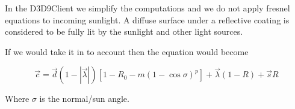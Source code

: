 \documentclass[twocolumn]{report}
\newenvironment{twocol}[0]{%
\begin{list}{}{%
\onecolumn
\setlength{\leftmargin}{0cm}%
\setlength{\rightmargin}{0cm}%
}%
\item[]}{\end{list}}
\begin{document}
\begin{twocol}
In the D3D9Client we simplify the computations and we do not apply fresnel equations to incoming sunlight. A diffuse surface under a reflective coating is considered to be fully lit by the sunlight and other light sources. 

If we would take it in to account then the equation would become

\begin{equation}
\vec{c} = \vec{d}(1-|\vec{\lambda}|)[1-R_0-m(1-\cos\sigma)^p] + \vec{\lambda}(1-R) + \vec{s}R
\end{equation}

Where $\sigma$ is the normal/sun angle.

\end{twocol}
\end{document}

